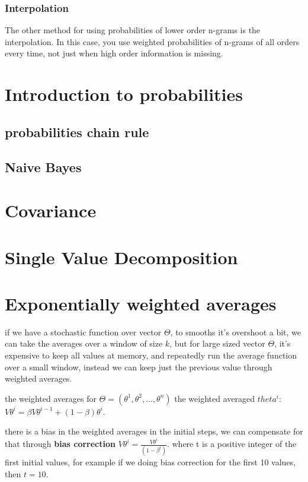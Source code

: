 \documentclass[4apaper,12pt]{book}
\begin{document}
\begin{description}
    \subsection{Interpolation}
    \begin{description}
    \item The other method for using probabilities of lower order n-grams is the interpolation. In this case, you use weighted probabilities of n-grams of all orders every time, not just when high order information is missing.
    \end{description}


\end{description}

\citep{xyz2}



\begin{appendices}
  \chapter{Introduction to probabilities}
  \section{probabilities chain rule}
  \section {Naive Bayes}
  \chapter{Covariance}
  \chapter{Single Value Decomposition}
  \chapter {Exponentially weighted averages}
  \begin{description}
  \item if we have a stochastic function over vector $\Theta$, to smooths it's overshoot a bit, we can take the averages over a window of size $k$, but for large sized vector $\Theta$, it's expensive to keep all values at memory, and repeatedly run the average function over a small window, instead we can keep just the previous value through weighted averages.
  \item the weighted averages for $\Theta=(\theta^1,\theta^2,...,\theta^n)$ the weighted averaged $theta^i$: $V\theta^i=\beta V \theta^{i-1} + (1-\beta) \theta^i$.
  \item there is a bias in the weighted averages in the initial steps, we can compensate for that through \textbf{bias correction} $V\theta^i=\frac{V\theta^i}{(1-\beta^t)}$. where t is a positive integer of the first initial values, for example if we doing bias correction for the first 10 values, then $t=10$.

\end{description}
\end{appendices}
\end{document}
